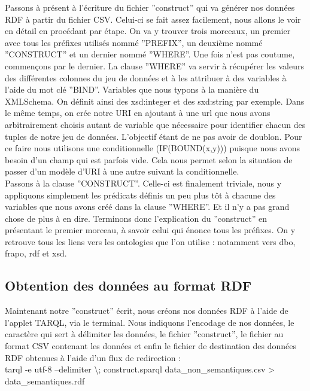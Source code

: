\documentclass[a4paper,sffamily,12pt]{article}
\begin{document}
			Passons à présent à l'écriture du fichier ''construct'' qui va générer nos données RDF à partir du fichier CSV. Celui-ci se fait assez facilement, nous allons le voir en détail en procédant par étape. On va y trouver trois morceaux, un premier avec tous les préfixes utilisés nommé ''PREFIX'', un deuxième nommé ''CONSTRUCT'' et un dernier nommé ''WHERE''. Une fois n'est pas coutume, commençons par le dernier. La clause ''WHERE'' va servir à récupérer les valeurs des différentes colonnes du jeu de données et à les attribuer à des variables à l'aide du mot clé ''BIND''. Variables que nous typons à la manière du XMLSchema. On définit ainsi des xsd:integer et des sxd:string par exemple. Dans le même temps, on crée notre URI en ajoutant à une url que nous avons arbitrairement choisis autant de variable que nécessaire pour identifier chacun des tuples de notre jeu de données. L'objectif étant de ne pas avoir de doublon. Pour ce faire nous utilisons une conditionnelle (IF(BOUND(x,y))) puisque nous avons besoin d'un champ qui est parfois vide. Cela nous permet selon la situation de passer d'un modèle d'URI à une autre suivant la conditionnelle. \\
			
			\indent Passons à la clause ''CONSTRUCT''. Celle-ci est finalement triviale,  nous y appliquons simplement les prédicats définis un peu plus tôt à chacune des variables que nous avons créé dans la clause ''WHERE''.  Et il n'y a pas grand chose de plus à en dire. Terminons donc l'explication du ''construct'' en présentant le premier morceau, à savoir celui qui énonce tous les préfixes. On y retrouve tous les liens vers les ontologies que l'on utilise : notamment vers dbo, frapo, rdf et xsd. \\
			
			\vspace{0.5cm}
			
		\subsection{Obtention des données au format RDF}
			
			\vspace{0.5cm}
	
			Maintenant notre ''construct'' écrit, nous créons nos données RDF à l'aide de l'applet TARQL, via le terminal. Nous indiquons l'encodage de nos données, le caractère qui sert à délimiter les données, le fichier ''construct'', le fichier au format CSV contenant les données et enfin le fichier de destination des données RDF obtenues à l'aide d'un flux de redirection : \\
			tarql -e utf-8 --delimiter \textbackslash; construct.sparql data\_non\_semantiques.csv > data\_semantiques.rdf
\end{document}
